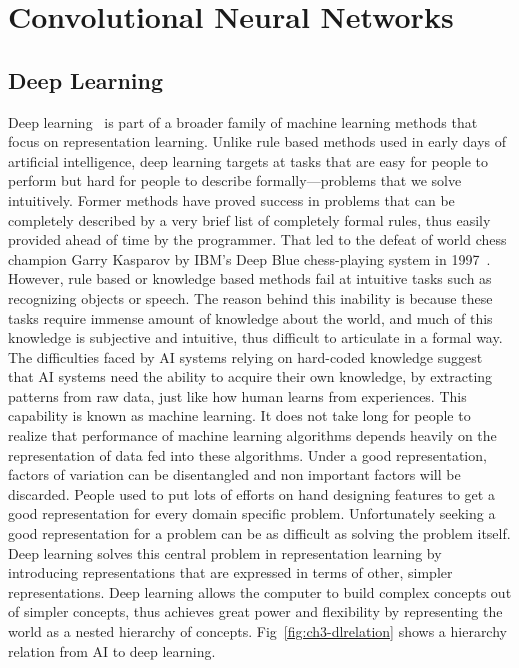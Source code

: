 \chapter{Convolutional Neural Networks}\label{sec-cnn}
\iffalse
\section{Deep Learning}

Deep learning~\cite{lecun2015deep, Goodfellow-et-al-2016-Book} is part of a broader family of machine learning methods that focus on representation learning. Unlike rule based methods used in early days of artificial intelligence, deep learning targets at tasks that are easy for people to perform but hard for people to describe formally---problems that we solve intuitively. Former methods have proved success in problems that can be completely described by a very brief list of completely formal rules, thus easily provided ahead of time by the programmer. That led to the defeat of world chess champion Garry Kasparov by IBM's Deep Blue chess-playing system in 1997~\cite{hsu2002behind}. However, rule based or knowledge based methods fail at intuitive tasks such as recognizing objects or speech. The reason behind this inability is because these tasks require immense amount of knowledge about the world, and much of this knowledge is subjective and intuitive, thus difficult to articulate in a formal way. The difficulties faced by AI systems relying on hard-coded knowledge suggest that AI systems need the ability to acquire their own knowledge, by extracting patterns from raw data, just like how human learns from experiences. This capability is known as machine learning. It does not take long for people to realize that performance of machine learning algorithms depends heavily on the representation of data fed into these algorithms. Under a good representation, factors of variation can be disentangled and non important factors will be discarded. People used to put lots of efforts on hand designing features to get a good representation for every domain specific problem. Unfortunately seeking a good representation for a problem can be as difficult as solving the problem itself. Deep learning solves this central problem in representation learning by introducing representations that are expressed in terms of other, simpler representations. Deep learning allows the computer to build complex concepts out of simpler concepts, thus achieves great power and flexibility by representing the world as a nested hierarchy of concepts. Fig~\ref{fig:ch3-dlrelation} shows a hierarchy relation from AI to deep learning.

